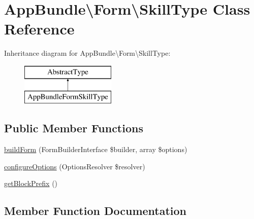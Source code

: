 \hypertarget{class_app_bundle_1_1_form_1_1_skill_type}{}\section{App\+Bundle\textbackslash{}Form\textbackslash{}Skill\+Type Class Reference}
\label{class_app_bundle_1_1_form_1_1_skill_type}
Inheritance diagram for App\+Bundle\textbackslash{}Form\textbackslash{}Skill\+Type\+:\begin{figure}[H]
\begin{center}
\leavevmode
\includegraphics[height=2.000000cm]{class_app_bundle_1_1_form_1_1_skill_type}
\end{center}
\end{figure}
\subsection*{Public Member Functions}
\begin{DoxyCompactItemize}
\item 
\mbox{\hyperlink{class_app_bundle_1_1_form_1_1_skill_type_a849b17cb441eee94c23e849ad54acf7a}{build\+Form}} (Form\+Builder\+Interface \$builder, array \$options)
\item 
\mbox{\hyperlink{class_app_bundle_1_1_form_1_1_skill_type_aaebaf3b685fa968a94a4cd89fca72a9f}{configure\+Options}} (Options\+Resolver \$resolver)
\item 
\mbox{\hyperlink{class_app_bundle_1_1_form_1_1_skill_type_a40d9ea856188ed3c84fb1453d9b521f3}{get\+Block\+Prefix}} ()
\end{DoxyCompactItemize}


\subsection{Member Function Documentation}
\mbox{\label{class_app_bundle_1_1_form_1_1_skill_type_a849b17cb441eee94c23e849ad54acf7a}} 
